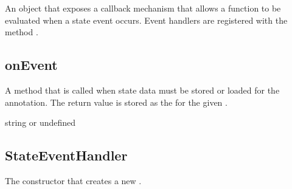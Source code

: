 \documentclass[letterpaper,12pt,english,openany,oneside]{sphinxmanual}
\begin{document}
An object that exposes a callback mechanism that allows a function to be evaluated when a state event occurs. Event handlers are registered with the  method .


\subsection{onEvent}
\label{\detokenize{JS_3D_API:onevent-8}}\label{\detokenize{JS_3D_API:id36}}
A method that is called when state data must be stored or loaded for the annotation. The return value is stored as the  for the given .

\label{\detokenize{JS_3D_API:syntax-119}}

\begin{sphinxVerbatim}[commandchars=\\\{\}]
\end{sphinxVerbatim}
\label{\detokenize{JS_3D_API:parameters-86}}

\label{\detokenize{JS_3D_API:section-120}}\label{\detokenize{JS_3D_API:returns-120}}

string or undefined


\subsection{StateEventHandler}
\label{\detokenize{JS_3D_API:stateeventhandler-1}}\label{\detokenize{JS_3D_API:id37}}
The constructor that creates a new .

\label{\detokenize{JS_3D_API:syntax-120}}

\begin{sphinxVerbatim}[commandchars=\\\{\}]
 
\end{sphinxVerbatim}
\label{\detokenize{JS_3D_API:returns-121}}

\begin{sphinxVerbatim}[commandchars=\\\{\}]
 
\end{sphinxVerbatim}
\end{document}
